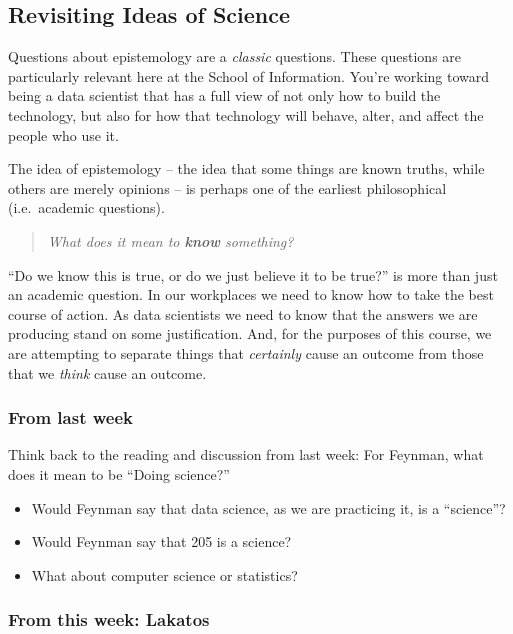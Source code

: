 \documentclass[
]{article}
\providecommand{\tightlist}{%
  \setlength{\itemsep}{0pt}\setlength{\parskip}{0pt}}
\theoremstyle{definition}
\theoremstyle{definition}
\theoremstyle{definition}
\theoremstyle{definition}
\theoremstyle{remark}
\begin{document}
\subsection{Revisiting Ideas of Science}\label{revisiting-ideas-of-science}

Questions about epistemology are a \emph{classic} questions. These questions are particularly relevant here at the School of Information. You're working toward being a data scientist that has a full view of not only how to build the technology, but also for how that technology will behave, alter, and affect the people who use it.

The idea of epistemology -- the idea that some things are known truths, while others are merely opinions -- is perhaps one of the earliest philosophical (i.e.~academic questions).

\begin{quote}
\emph{What does it mean to \textbf{know} something?}
\end{quote}

``Do we know this is true, or do we just believe it to be true?'' is more than just an academic question. In our workplaces we need to know how to take the best course of action. As data scientists we need to know that the answers we are producing stand on some justification. And, for the purposes of this course, we are attempting to separate things that \emph{certainly} cause an outcome from those that we \emph{think} cause an outcome.

\subsubsection{From last week}\label{from-last-week}

Think back to the reading and discussion from last week: For Feynman, what does it mean to be ``Doing science?''

\begin{itemize}
\tightlist
\item
  Would Feynman say that data science, as we are practicing it, is a ``science''?
\item
  Would Feynman say that 205 is a science?
\item
  What about computer science or statistics?
\end{itemize}

\subsubsection{From this week: Lakatos}\label{from-this-week-lakatos}
\end{document}
